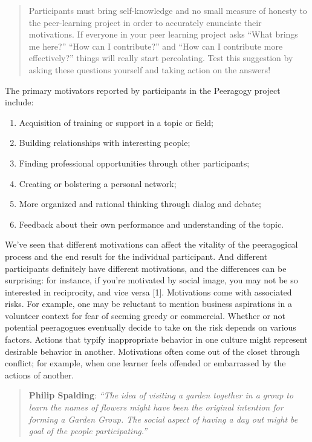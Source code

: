 \begin{quote}
Participants must bring self-knowledge and no small measure of honesty
to the peer-learning project in order to accurately enunciate their
motivations. If everyone in your peer learning project asks ``What
brings me here?'' ``How can I contribute?'' and ``How can I contribute
more effectively?'' things will really start percolating. Test this
suggestion by asking these questions yourself and taking action on the
answers!
\end{quote}
The primary motivators reported by participants in the Peeragogy project
include:

\begin{enumerate}
\item
  Acquisition of training or support in a topic or field;
\item
  Building relationships with interesting people;
\item
  Finding professional opportunities through other participants;
\item
  Creating or bolstering a personal network;
\item
  More organized and rational thinking through dialog and debate;
\item
  Feedback about their own performance and understanding of the topic.
\end{enumerate}
We've seen that different motivations can affect the vitality of the
peeragogical process and the end result for the individual participant.
And different participants definitely have different motivations, and
the differences can be surprising: for instance, if you're motivated by
social image, you may not be so interested in reciprocity, and vice
versa {[}1{]}. Motivations come with associated risks. For example, one
may be reluctant to mention business aspirations in a volunteer context
for fear of seeming greedy or commercial. Whether or not potential
peeragogues eventually decide to take on the risk depends on various
factors. Actions that typify inappropriate behavior in one culture might
represent desirable behavior in another. Motivations often come out of
the closet through conflict; for example, when one learner feels
offended or embarrassed by the actions of another.

\begin{quote}
\textbf{Philip Spalding}: \emph{``The idea of visiting a garden together
in a group to learn the names of flowers might have been the original
intention for forming a Garden Group. The social aspect of having a day
out might be goal of the people participating.''}
\end{quote}

